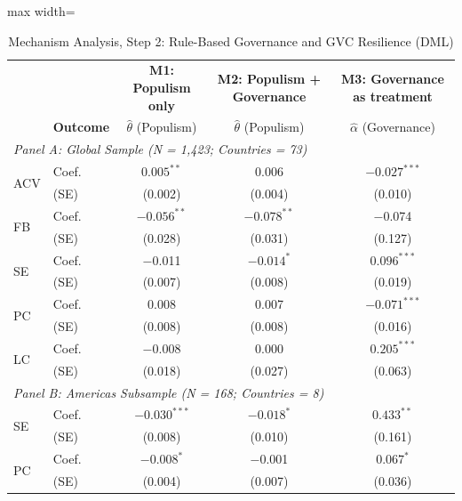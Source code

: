 
\begin{table}[!htbp]
\centering
\caption{Mechanism Analysis, Step 2: Rule-Based Governance and GVC Resilience (DML)}
\label{tab:mech2}
\begin{adjustbox}{max width=\textwidth}
\begin{tabular}{llccc}
\toprule
& & \textbf{M1: Populism only} & \textbf{M2: Populism + Governance} & \textbf{M3: Governance as treatment} \\
& \textbf{Outcome} & $\hat{\theta}$ (Populism) & $\hat{\theta}$ (Populism) & $\hat{\alpha}$ (Governance) \\
\midrule

\multicolumn{5}{l}{\textit{Panel A: Global Sample (N = 1,423; Countries = 73)}} \\[2pt]

\multirow{2}{*}{ACV} & Coef. & $0.005^{**}$ & 0.006 & $-0.027^{***}$ \\
& (SE) & (0.002) & (0.004) & (0.010) \\[3pt]

\multirow{2}{*}{FB} & Coef. & $-0.056^{**}$ & $-0.078^{**}$ & $-$0.074 \\
& (SE) & (0.028) & (0.031) & (0.127) \\[3pt]

\multirow{2}{*}{SE} & Coef. & $-$0.011 & $-0.014^{*}$ & $0.096^{***}$ \\
& (SE) & (0.007) & (0.008) & (0.019) \\[3pt]

\multirow{2}{*}{PC} & Coef. & 0.008 & 0.007 & $-0.071^{***}$ \\
& (SE) & (0.008) & (0.008) & (0.016) \\[3pt]

\multirow{2}{*}{LC} & Coef. & $-$0.008 & 0.000 & $0.205^{***}$ \\
& (SE) & (0.018) & (0.027) & (0.063) \\[3pt]

\midrule
\multicolumn{5}{l}{\textit{Panel B: Americas Subsample (N = 168; Countries = 8)}} \\[2pt]

\multirow{2}{*}{SE} & Coef. & $-0.030^{***}$ & $-0.018^{*}$ & $0.433^{**}$ \\
& (SE) & (0.008) & (0.010) & (0.161) \\[3pt]

\multirow{2}{*}{PC} & Coef. & $-0.008^{*}$ & $-$0.001 & $0.067^{*}$ \\
& (SE) & (0.004) & (0.007) & (0.036) \\[3pt]


\end{tabular}
\end{adjustbox}
\end{table}

